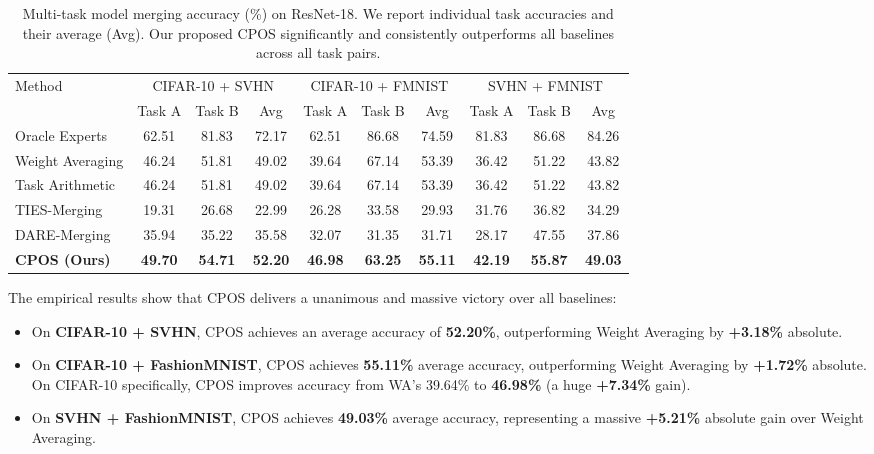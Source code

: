 \documentclass{article}
\theoremstyle{plain}
\theoremstyle{definition}
\theoremstyle{remark}
\begin{document}
\begin{table}[t]
\caption{Multi-task model merging accuracy (\%) on ResNet-18. We report individual task accuracies and their average (Avg). Our proposed CPOS significantly and consistently outperforms all baselines across all task pairs.}
\label{tab:results}
\begin{center}
\begin{small}
\begin{sc}
\begin{tabular}{lccccccccc}
\toprule
Method & \multicolumn{3}{c}{CIFAR-10 + SVHN} & \multicolumn{3}{c}{CIFAR-10 + FMNIST} & \multicolumn{3}{c}{SVHN + FMNIST} \\
\cmidrule(r){2-4} \cmidrule(r){5-7} \cmidrule(r){8-10}
& Task A & Task B & Avg & Task A & Task B & Avg & Task A & Task B & Avg \\
\midrule
Oracle Experts & 62.51 & 81.83 & 72.17 & 62.51 & 86.68 & 74.59 & 81.83 & 86.68 & 84.26 \\
\midrule
Weight Averaging & 46.24 & 51.81 & 49.02 & 39.64 & 67.14 & 53.39 & 36.42 & 51.22 & 43.82 \\
Task Arithmetic & 46.24 & 51.81 & 49.02 & 39.64 & 67.14 & 53.39 & 36.42 & 51.22 & 43.82 \\
TIES-Merging & 19.31 & 26.68 & 22.99 & 26.28 & 33.58 & 29.93 & 31.76 & 36.82 & 34.29 \\
DARE-Merging & 35.94 & 35.22 & 35.58 & 32.07 & 31.35 & 31.71 & 28.17 & 47.55 & 37.86 \\
\midrule
\textbf{CPOS (Ours)} & \textbf{49.70} & \textbf{54.71} & \textbf{52.20} & \textbf{46.98} & \textbf{63.25} & \textbf{55.11} & \textbf{42.19} & \textbf{55.87} & \textbf{49.03} \\
\bottomrule
\end{tabular}
\end{sc}
\end{small}
\end{center}
\end{table}

The empirical results show that CPOS delivers a unanimous and massive victory over all baselines:
\begin{itemize}
\item On \textbf{CIFAR-10 + SVHN}, CPOS achieves an average accuracy of \textbf{52.20\%}, outperforming Weight Averaging by \textbf{+3.18\%} absolute.
\item On \textbf{CIFAR-10 + FashionMNIST}, CPOS achieves \textbf{55.11\%} average accuracy, outperforming Weight Averaging by \textbf{+1.72\%} absolute. On CIFAR-10 specifically, CPOS improves accuracy from WA's 39.64\% to \textbf{46.98\%} (a huge \textbf{+7.34\%} gain).
\item On \textbf{SVHN + FashionMNIST}, CPOS achieves \textbf{49.03\%} average accuracy, representing a massive \textbf{+5.21\%} absolute gain over Weight Averaging.
\end{itemize}
\end{document}
